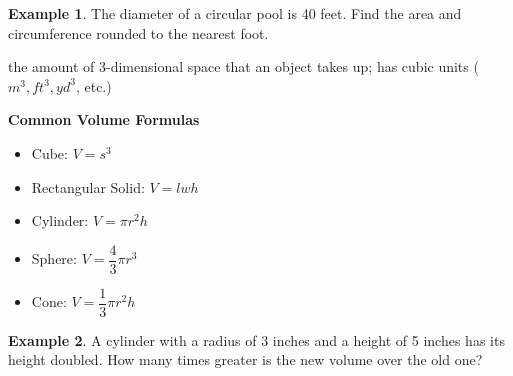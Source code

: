 \documentclass[addpoints,12pt]{exam}
\theoremstyle{definition}
\theoremstyle{break}
\theoremstyle{break}
\newtheorem{example}{Example}[subsection]
\begin{document}
\begin{example}
The diameter of a circular pool is 40 feet. Find the area and circumference rounded to the nearest foot.
\end{example}

\newpage

\begin{definition}[Volume]
the amount of 3-dimensional space that an object takes up; has cubic units ($m^3, ft^3, yd^3$, etc.)
\end{definition}
\vspace{.15in}

\begin{mdframed}
\textbf{Common Volume Formulas}
\begin{itemize}
\item Cube: $V = s^3$
\item Rectangular Solid: $V = lwh$
\item Cylinder: $V = \pi r^2h$
\item Sphere: $V = \dfrac{4}{3}\pi r^3$
\item Cone: $V = \dfrac{1}{3}\pi r^2h$
\end{itemize}
\end{mdframed}

\vspace{.15in}
\begin{example}
A cylinder with a radius of 3 inches and a height of 5 inches has its height doubled. How many times greater is the new volume over the old one?
\end{example}
\end{document}
